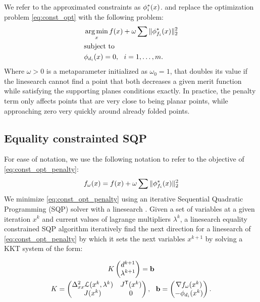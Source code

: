 We refer to the approximated constraints as $\phi^*_i(x)$. and replace the optimization problem \eqref{eq:const_opt} with the following problem:
\begin{equation} \label{eq:const_opt_penalty}
\begin{aligned}
& \operatorname*{arg\,min}_x f(x) + \omega \sum \|\phi^*_{f_i}(x)\|_2^2 \\
& \textrm{subject to} \\
& \phi_{d_i}(x) = 0, \ \  i = 1, \ldots, m. \\ 
\end{aligned}
\end{equation}
Where $\omega > 0$ is a metaparameter initialized as $\omega_0 = 1$, that doubles its value if the linesearch cannot find a point that both decreases a given merit function while satisfying the supporting planes conditions exactly. In practice, the penalty term only affects points that are very close to being planar points, while approaching zero very quickly around already folded points.

\subsection{Equality constrainted SQP}
For ease of notation, we use the following notation to refer to the objective of \eqref{eq:const_opt_penalty}:
\begin{equation}
f_\omega(x) = f(x) + \omega \sum \|\phi^*_{f_i}(x)\|_2^2
\end{equation}
We minimize \eqref{eq:const_opt_penalty} using an iterative Sequential Quadratic Programming (SQP) solver with a linesearch \cite{nocedal}. Given a set of variables at a given iteration $x^k$ and current values of lagrange multipliers $\lambda^k$, a linesearch equality constrained SQP algorithm iteratively find the next direction for a linesearch of \eqref{eq:const_opt_penalty} by which it sets the next variables $x^{k+1}$ by solving a KKT system of the form:

\begin{equation} \label{eq:KKT_eps}
\begin{gathered}
{K} \begin{pmatrix} d^{k+1} \\ \lambda^{k+1} \end{pmatrix}=\mathbf{b} \\
{K}=\begin{pmatrix}
{\Delta^2_{xx}\mathcal{L}(x^k,\lambda^k)} & {J^\tr}(\x^k)\\
{J(\x^k)} &  0 \\
\end{pmatrix}, \ \ 
\mathbf{b}=\begin{pmatrix}
{\nabla f_\omega(x^k)} \\ 
-\phi_{d_i}(x^k)\\
\end{pmatrix}.
\end{gathered}
\end{equation}

